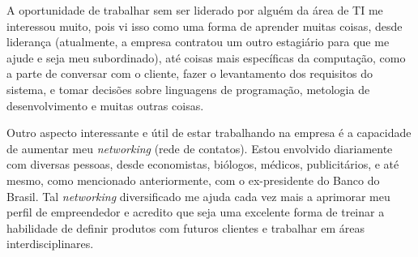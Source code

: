 A oportunidade de trabalhar sem ser liderado por alguém da área de TI me interessou muito, pois vi isso como uma 
forma de aprender muitas coisas, desde liderança (atualmente, a empresa contratou um outro estagiário para que me
ajude e seja meu subordinado), até coisas mais específicas da computação, como a parte de conversar com o cliente,
fazer o levantamento dos requisitos do sistema, e tomar decisões sobre linguagens de programação, metologia de desenvolvimento
e muitas outras coisas.

Outro aspecto interessante e útil de estar trabalhando na empresa é a capacidade de aumentar meu \textit{networking} (rede de contatos).
Estou envolvido diariamente com diversas pessoas, desde economistas, biólogos, médicos, publicitários, e até mesmo, como mencionado
anteriormente, com o ex-presidente do Banco do Brasil. Tal \textit{networking} diversificado me ajuda cada vez mais a aprimorar 
meu perfil de empreendedor e acredito que seja uma excelente forma de treinar a habilidade de definir produtos com futuros clientes
e trabalhar em áreas interdisciplinares.
